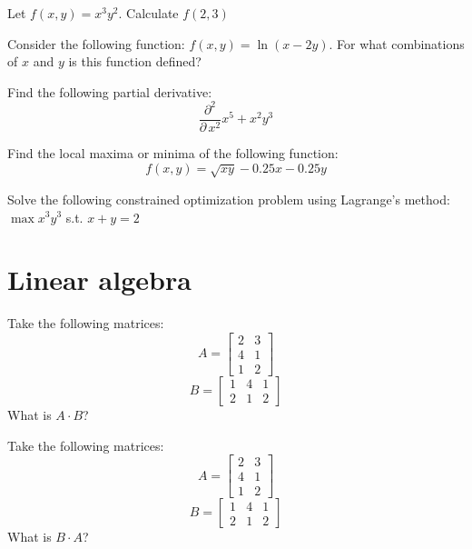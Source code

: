 \documentclass[10pt]{article}
\newenvironment{problem}[2][Problem]{\begin{trivlist}
\item[\hskip \labelsep {\bfseries #1}\hskip \labelsep {\bfseries #2.}]}{\end{trivlist}}
\begin{document}
\begin{problem}{3.8}
Let $f(x,y)=x^3y^2$. Calculate $f(2,3)$
\end{problem}

\begin{problem}{3.9}
Consider the following function: $f(x,y)=\ln(x-2y)$. For what combinations of $x$ and $y$ is this function defined?
\end{problem}

\begin{problem}{3.10}
Find the following partial derivative:
$$\frac{\partial^2}{\partial \, x^2} x^5+x^2y^3$$
\end{problem}

\begin{problem}{3.11}
Find the local maxima or minima of the following function:
$$f(x,y)=\sqrt{xy}-0.25x-0.25y$$
\end{problem}

\begin{problem}{3.12}
Solve the following constrained optimization problem using Lagrange's method:
$\max x^3y^3$ s.t. $x+y=2$
\end{problem}

\section{Linear algebra}

\begin{problem}{4.1}
Take the following matrices:
$$A=\begin{bmatrix} 2 & 3\\ 4 & 1 \\ 1 & 2\end{bmatrix}$$
$$B=\begin{bmatrix} 1 & 4 & 1\\2 & 1 & 2\end{bmatrix}$$
What is $A \cdot B$?
\end{problem}

\begin{problem}{4.2}
Take the following matrices:
$$A=\begin{bmatrix} 2 & 3\\ 4 & 1 \\ 1 & 2\end{bmatrix}$$
$$B=\begin{bmatrix} 1 & 4 & 1\\2 & 1 & 2\end{bmatrix}$$
What is $B \cdot A$?
\end{problem}
\end{document}

